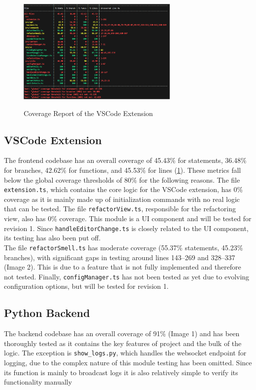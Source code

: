 \documentclass[12pt, titlepage]{article}
\begin{document}
\begin{figure}[H]
  \centering
  \includegraphics[width=0.7\textwidth]{../Images/vscode-coverage.png}
  \label{img:vscode-cov}
  \caption{Coverage Report of the VSCode Extension}
\end{figure}

\subsection{VSCode Extension}
The frontend codebase has an overall coverage of 45.43\% for statements, 36.48\% for branches, 42.62\% for functions, and 45.53\% for lines (\ref{img:vscode-cov}). These metrics fall below the global coverage thresholds of 80\% for the following reasons. The file \texttt{extension.ts}, which contains the core logic for the VSCode extension, has 0\% coverage as it is mainly made up of initialization commands with no real logic that can be tested. The file \texttt{refactorView.ts}, responsible for the refactoring view, also has 0\% coverage. This module is a UI component and will be tested for revision 1. Since \texttt{handleEditorChange.ts} is closely related to the UI component, its testing has also been put off.\\

The file \texttt{refactorSmell.ts} has moderate coverage (55.37\% statements, 45.23\% branches), with significant gaps in testing around lines 143–269 and 328–337 (Image 2). This is due to a feature that is not fully implemented and therefore not tested. Finally, \texttt{configManager.ts} has not been tested as yet due to evolving configuration options, but will be tested for revision 1.

\subsection{Python Backend}
The backend codebase has an overall coverage of 91\% (Image 1) and has been thoroughly tested as it contains the key features of project and the bulk of the logic. The exception is \texttt{show\_logs.py}, which handles the websocket endpoint for logging, due to the complex nature of this module testing has been omitted. Since its function is mainly to broadcast logs it is also relatively simple to verify its functionality manually\\
\end{document}
